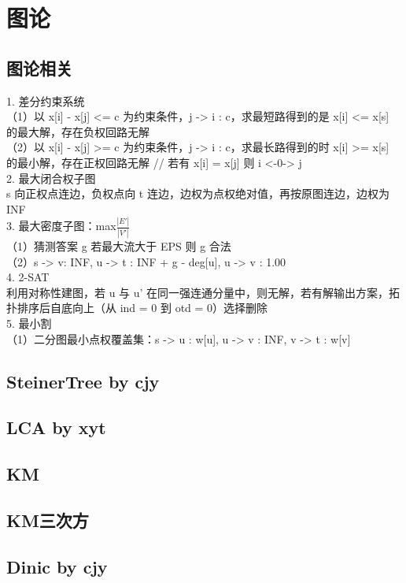 \documentclass[11pt]{article}
\begin{document}
	\section{图论}
		\subsection{图论相关}
		
		1. 差分约束系统\\
  （1）以 x[i] - x[j] <= c 为约束条件，j -> i : c，求最短路得到的是 x[i] <= x[s] 的最大解，存在负权回路无解\\
  （2）以 x[i] - x[j] >= c 为约束条件，j -> i : c，求最长路得到的时 x[i] >= x[s] 的最小解，存在正权回路无解
  // 若有 x[i] = x[j] 则 i <-0-> j\\
2. 最大闭合权子图\\
  s 向正权点连边，负权点向 t 连边，边权为点权绝对值，再按原图连边，边权为INF\\
3. 最大密度子图：max{$\frac{|E'|}{|V'|}$}\\
  （1）猜测答案 g 若最大流大于 EPS 则 g 合法\\
  （2）s -> v: INF, u -> t : INF + g - deg[u], u -> v : 1.00\\
4. 2-SAT\\
  利用对称性建图，若 u 与 u' 在同一强连通分量中，则无解，若有解输出方案，拓扑排序后自底向上（从 ind = 0 到 otd = 0）选择删除\\
5. 最小割\\
  （1）二分图最小点权覆盖集：s -> u : w[u], u -> v : INF, v -> t : w[v]\\
		\subsection{SteinerTree by cjy}
		
		\subsection{LCA by xyt}
		
		\subsection{KM}
		
		\subsection{KM三次方}
		
		\subsection{Dinic by cjy}
		
\end{document}
